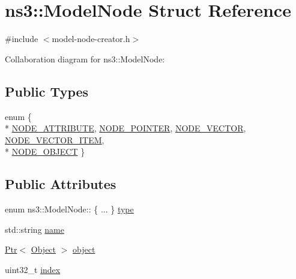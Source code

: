 \hypertarget{structns3_1_1ModelNode}{}\section{ns3\+:\+:Model\+Node Struct Reference}
\label{structns3_1_1ModelNode}


{\ttfamily \#include $<$model-\/node-\/creator.\+h$>$}



Collaboration diagram for ns3\+:\+:Model\+Node\+:
\subsection*{Public Types}
\begin{DoxyCompactItemize}
\item 
enum \{ \\*
\hyperlink{structns3_1_1ModelNode_a22be879e8f178bb2d90182501e1e9c81af5c4dd1eb87e6c30e9784b7c925c11fa}{N\+O\+D\+E\+\_\+\+A\+T\+T\+R\+I\+B\+U\+TE}, 
\hyperlink{structns3_1_1ModelNode_a22be879e8f178bb2d90182501e1e9c81a59f2844c55fc8cae4a7d5df430039053}{N\+O\+D\+E\+\_\+\+P\+O\+I\+N\+T\+ER}, 
\hyperlink{structns3_1_1ModelNode_a22be879e8f178bb2d90182501e1e9c81a1ce2f1a508b8fef3baf26ebfc6a979cf}{N\+O\+D\+E\+\_\+\+V\+E\+C\+T\+OR}, 
\hyperlink{structns3_1_1ModelNode_a22be879e8f178bb2d90182501e1e9c81a63dfc4f90f59ab726bf9c3ef26a627ba}{N\+O\+D\+E\+\_\+\+V\+E\+C\+T\+O\+R\+\_\+\+I\+T\+EM}, 
\\*
\hyperlink{structns3_1_1ModelNode_a22be879e8f178bb2d90182501e1e9c81a39aa7227cc5fb3f71b32d23b7530dafc}{N\+O\+D\+E\+\_\+\+O\+B\+J\+E\+CT}
 \}
\end{DoxyCompactItemize}
\subsection*{Public Attributes}
\begin{DoxyCompactItemize}
\item 
enum ns3\+::\+Model\+Node\+:: \{ ... \}  \hyperlink{structns3_1_1ModelNode_abdf85277cc66a9ad43b6a568b22d9ce7}{type}
\item 
std\+::string \hyperlink{structns3_1_1ModelNode_abede70026321b9321c75b8750f62de5f}{name}
\item 
\hyperlink{classns3_1_1Ptr}{Ptr}$<$ \hyperlink{classns3_1_1Object}{Object} $>$ \hyperlink{structns3_1_1ModelNode_a42fe7722df2b05f9422339201e5d1a20}{object}
\item 
uint32\+\_\+t \hyperlink{structns3_1_1ModelNode_a833c5f894c754d27c21cfbf6dc9866de}{index}
\end{DoxyCompactItemize}


